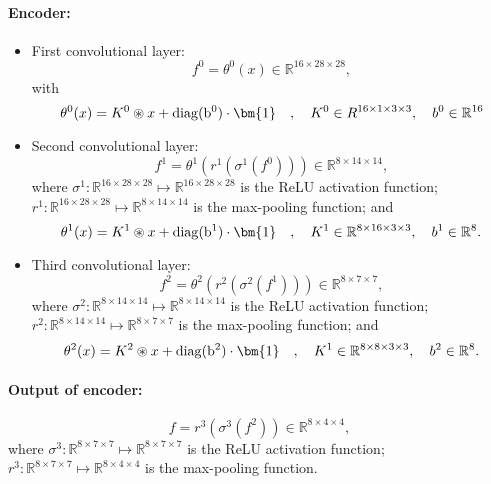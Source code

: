     \paragraph{Encoder:}
    \begin{itemize}
    \footnotesize
    \item  First convolutional layer:
    \begin{equation*}
        f^0 = \theta^0(x) \in \mathbb{R}^{16\times 28\times 28},
    \end{equation*}
    with
    \begin{equation*}
        \theta^0(x) = K^0 \circledast x + {\rm{diag}(b^0) }\cdot \bm{1} \quad, \quad K^0 \in R^{16 \times 1 \times 3 \times 3}, \quad b^0 \in \mathbb R^{16}
    \end{equation*}
    \item  Second convolutional layer:
    \begin{equation*}
        f^1 = \theta^1(r^1(\sigma^1 (f^0)))\in \mathbb{R}^{8\times 14\times 14},
    \end{equation*}
            where $\sigma^1: \mathbb{R}^{16\times 28\times 28}\mapsto \mathbb{R}^{16\times 28\times 28}$ is the ReLU activation function; $r^1:\mathbb{R}^{16\times 28\times 28}\mapsto \mathbb{R}^{8\times 14\times 14}$ is the max-pooling function; and 
            \begin{equation*}
                \theta^1(x) = K^1 \circledast x + {\rm{diag}(b^1) }\cdot \bm{1} \quad, \quad K^1 \in \mathbb R^{8 \times 16 \times 3 \times 3}, \quad b^1 \in \mathbb R^{8}.
            \end{equation*}
    \item  Third convolutional layer:
    \begin{equation*}
        f^2 = \theta^2(r^2(\sigma^2 (f^1)))\in \mathbb{R}^{8\times 7\times 7},
    \end{equation*}
            where $\sigma^2: \mathbb{R}^{8\times 14\times 14}\mapsto \mathbb{R}^{8\times 14\times 14}$ is the ReLU activation function; $r^2:\mathbb{R}^{8\times 14\times 14}\mapsto \mathbb{R}^{8\times 7\times 7}$ is the max-pooling function; and 
            \begin{equation*}
                \theta^2(x) = K^2 \circledast x + {\rm{diag}(b^2) }\cdot \bm{1} \quad, \quad K^1 \in \mathbb R^{8 \times 8 \times 3 \times 3}, \quad b^2 \in \mathbb R^{8}.
            \end{equation*}
    \end{itemize}

    \paragraph{Output of encoder:}
        \begin{equation*}
            f = r^3(\sigma^3(f^2))\in \mathbb{R}^{8\times 4\times 4},
        \end{equation*}
            where $\sigma^3: \mathbb{R}^{8\times 7\times 7}\mapsto \mathbb{R}^{8\times 7\times 7}$ is the ReLU activation function; $r^3:\mathbb{R}^{8\times 7\times 7}\mapsto \mathbb{R}^{8\times 4\times 4}$ is the max-pooling function. 

